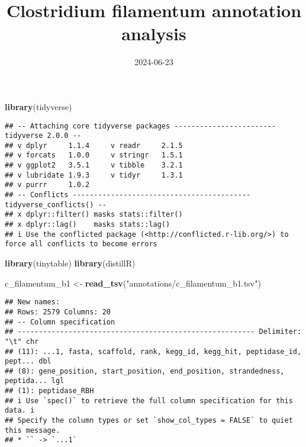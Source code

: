 \documentclass[
]{article}
\title{Clostridium filamentum annotation analysis}
\author{}
\date{\vspace{-2.5em}2024-06-23}
\newenvironment{Shaded}{\begin{snugshade}}{\end{snugshade}}
\newcommand{\FunctionTok}[1]{\textcolor[rgb]{0.13,0.29,0.53}{\textbf{#1}}}
\newcommand{\NormalTok}[1]{#1}
\newcommand{\OtherTok}[1]{\textcolor[rgb]{0.56,0.35,0.01}{#1}}
\newcommand{\StringTok}[1]{\textcolor[rgb]{0.31,0.60,0.02}{#1}}
\begin{document}
\maketitle

\begin{Shaded}
\begin{Highlighting}[]
\FunctionTok{library}\NormalTok{(tidyverse)}
\end{Highlighting}
\end{Shaded}

\begin{verbatim}
## -- Attaching core tidyverse packages ------------------------ tidyverse 2.0.0 --
## v dplyr     1.1.4     v readr     2.1.5
## v forcats   1.0.0     v stringr   1.5.1
## v ggplot2   3.5.1     v tibble    3.2.1
## v lubridate 1.9.3     v tidyr     1.3.1
## v purrr     1.0.2     
## -- Conflicts ------------------------------------------ tidyverse_conflicts() --
## x dplyr::filter() masks stats::filter()
## x dplyr::lag()    masks stats::lag()
## i Use the conflicted package (<http://conflicted.r-lib.org/>) to force all conflicts to become errors
\end{verbatim}

\begin{Shaded}
\begin{Highlighting}[]
\FunctionTok{library}\NormalTok{(tinytable)}
\FunctionTok{library}\NormalTok{(distillR)}
\end{Highlighting}
\end{Shaded}

\begin{Shaded}
\begin{Highlighting}[]
\NormalTok{c\_filamentum\_b1 }\OtherTok{\textless{}{-}} \FunctionTok{read\_tsv}\NormalTok{(}\StringTok{"annotations/c\_filamentum\_b1.tsv"}\NormalTok{)}
\end{Highlighting}
\end{Shaded}

\begin{verbatim}
## New names:
## Rows: 2579 Columns: 20
## -- Column specification
## -------------------------------------------------------- Delimiter: "\t" chr
## (11): ...1, fasta, scaffold, rank, kegg_id, kegg_hit, peptidase_id, pept... dbl
## (8): gene_position, start_position, end_position, strandedness, peptida... lgl
## (1): peptidase_RBH
## i Use `spec()` to retrieve the full column specification for this data. i
## Specify the column types or set `show_col_types = FALSE` to quiet this message.
## * `` -> `...1`
\end{verbatim}
\end{document}
